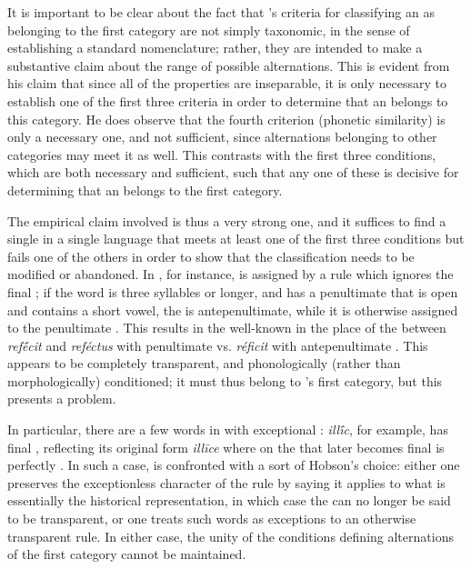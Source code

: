 It is important to be clear about the fact that {\Kruszewski}'s criteria
for classifying an  as belonging to the first category are
not simply taxonomic, in the sense of establishing a standard
nomenclature; rather, they are intended to make a substantive claim
about the range of possible alternations. This is evident from his
claim that since all of the properties are inseparable, it is only
necessary to establish one of the first three criteria in order to
determine that an  belongs to this category. He does
observe that the fourth criterion (phonetic similarity) is only a
necessary one, and not sufficient, since alternations belonging to
other categories may meet it as well. This contrasts with the first
three conditions, which are both necessary and sufficient, such that
any one of these is decisive for determining that an 
belongs to the first category.

The empirical claim involved is thus a very strong one, and it
suffices to find a single  in a single language that meets
at least one of the first three conditions but fails one of the others
in order to show that the classification needs to be modified or
abandoned. In , for instance,  is assigned by a rule which
ignores the final ; if the word is three syllables or longer,
and has a penultimate  that is open and contains a short
vowel, the  is antepenultimate, while it is otherwise assigned
to the penultimate . This results in the well-known
 in the place of the  between \emph{refḗcit} and
\emph{reféctus} with penultimate  vs. \emph{réficit} with
antepenultimate . This  appears to be completely
transparent, and phonologically (rather than morphologically)
conditioned; it must thus belong to {\Kruszewski}'s first category, but
this presents a problem.

In particular, there are a few words in  with exceptional :
\emph{illī́c}, for example, has final , reflecting its original
form \emph{illīce} where  on the  that later becomes
final is perfectly . In such a case, {\Kruszewski} is confronted
with a sort of Hobson's choice: either one preserves the exceptionless
character of the  rule by saying it applies to what is
essentially the historical representation, in which case the
 can no longer be said to be transparent, or one treats
such words as exceptions to an otherwise transparent rule. In either
case, the unity of the conditions defining alternations of the first
category cannot be maintained.

